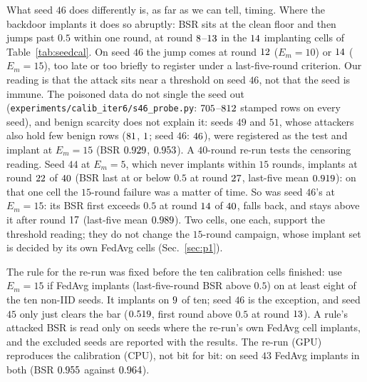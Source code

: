 \documentclass[journal]{IEEEtran}
\begin{document}
What seed $46$ does differently is, as far as we can tell, timing. Where the
backdoor implants it does so abruptly: BSR sits at the clean floor and then jumps
past $0.5$ within one round, at round $8$--$13$ in the
$14$ implanting cells of Table~\ref{tab:seedcal}. On seed $46$ the jump
comes at round $12$ ($E_m=10$) or
$14$ ($E_m=15$), too late or too briefly to register
under a last-five-round criterion. Our reading is
that the attack sits near a threshold on seed $46$, not that the seed is immune.
The poisoned data do not single the seed out
(\texttt{experiments/calib\_iter6/s46\_probe.py}: $705$--$812$
stamped rows on every seed), and benign scarcity does not explain it: seeds $49$ and
$51$, whose attackers also hold few benign rows ($81$, $1$;
seed $46$: $46$), were registered as the test and implant at $E_m=15$ (BSR $0.929$, $0.953$).
A $40$-round re-run tests the censoring reading. Seed $44$ at $E_m=5$, which never
implants within $15$ rounds, implants at round $22$ of
$40$ (BSR last at or below $0.5$ at round
$27$, last-five mean $0.919$): on that one
cell the $15$-round failure was a matter of time. So was seed $46$'s at $E_m=15$:
its BSR first exceeds $0.5$ at round $14$ of
$40$, falls back, and stays above it after round
$17$ (last-five mean $0.989$). Two cells, one each, support the threshold reading;
they do not change the $15$-round campaign, whose implant set is decided by its own
FedAvg cells (Sec.~\ref{sec:p1}).

The rule for the re-run was fixed before the ten calibration cells finished: use
$E_m=15$ if FedAvg implants (last-five-round BSR above $0.5$) on at least eight of
the ten non-IID seeds. It implants on $9$ of ten; seed $46$ is
the exception, and seed $45$ only just clears the bar ($0.519$,
first round above $0.5$ at round $13$). A rule's
attacked BSR is read only on seeds where the re-run's own FedAvg cell implants,
and the excluded seeds are reported with the results. The re-run (GPU) reproduces the calibration (CPU), not bit for bit: on seed $43$
FedAvg implants in both (BSR $0.955$ against $0.964$).
\end{document}
